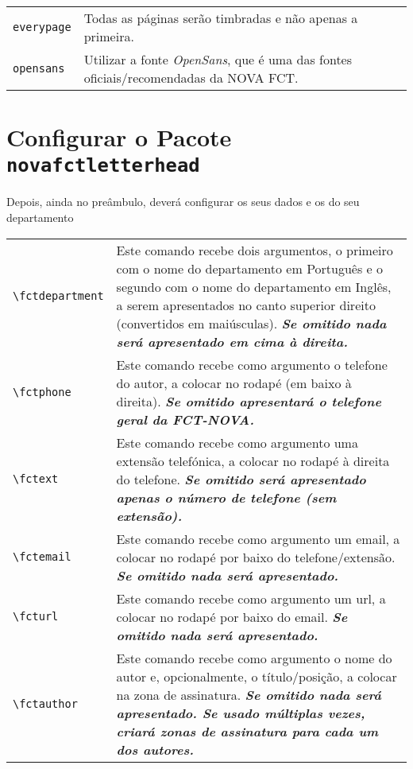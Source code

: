 \documentclass[a4paper,11pt]{article}
\newcommand*{\thePackage}{\texttt{novafctletterhead}}
\begin{document}
\bgroup
  \renewcommand{\arraystretch}{1.5}
  \begin{xltabular}{\textwidth}{lX}
    \texttt{everypage}  & Todas as páginas serão timbradas e não apenas a primeira.\\
    \texttt{opensans} & Utilizar a fonte \emph{OpenSans}, que é uma das fontes oficiais/recomendadas da NOVA FCT.\\
  \end{xltabular}
\egroup

\section{Configurar o Pacote \thePackage}

Depois, ainda no preâmbulo, deverá configurar os seus dados e os do seu departamento

\bgroup
  \renewcommand{\arraystretch}{1.5}
  \begin{xltabular}{\textwidth}{lX}
    \verb+\fctdepartment+ & Este comando recebe dois argumentos, o primeiro com o nome do departamento em Português e o segundo com o nome do departamento em Inglês, a serem apresentados no canto superior direito (convertidos em maiúsculas).  \textbf{\textsl{Se omitido nada será apresentado em cima à direita.}}\\
    \verb+\fctphone+   & Este comando recebe como argumento o telefone do autor, a colocar no rodapé (em baixo à direita). \textbf{\textsl{Se omitido apresentará o telefone geral da FCT-NOVA.}}\\
    \verb+\fctext+   & Este comando recebe como argumento uma extensão telefónica, a colocar no rodapé à direita do telefone. \textbf{\textsl{Se omitido será apresentado apenas o número de telefone (sem extensão).}}\\
    \verb+\fctemail+  & Este comando recebe como argumento um email, a colocar no rodapé por baixo do telefone/extensão. \textbf{\textsl{Se omitido nada será apresentado.}}\\
    \verb+\fcturl+   & Este comando recebe como argumento um url, a colocar no rodapé por baixo do email. \textbf{\textsl{Se omitido nada será apresentado.}}\\
    \verb+\fctauthor+     & Este comando recebe como argumento o nome do autor e, opcionalmente, o título/posição, a colocar na zona de assinatura.  \textbf{\textsl{Se omitido nada será apresentado.  Se usado múltiplas vezes, criará zonas de assinatura para cada um dos autores.}}\\
  \end{xltabular}
\egroup
\end{document}
